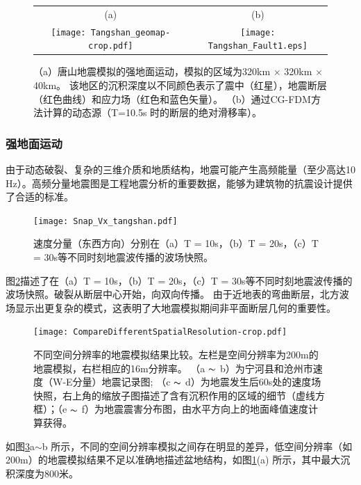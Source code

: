 \begin{figure}[t]
\begin{tabular}{cc}
(a) & (b) \\
    \texttt{[image: Tangshan\_geomap-crop.pdf]} &
    \texttt{[image: Tangshan\_Fault1.eps]}
\end{tabular}
    \caption{
（a）唐山地震模拟的强地面运动，模拟的区域为320km $\times$ 320km $\times$ 40km。 该地区的沉积深度以不同颜色表示了震中（红星），地震断层（红色曲线）和应力场（红色和蓝色矢量）。 （b）通过CG-FDM方法计算的动态源（T=10.5s 时的断层的绝对滑移率）。}
    \label{fig:tangshan_geomap}
\end{figure}


\subsubsection{强地面运动}

由于动态破裂、复杂的三维介质和地质结构，地震可能产生高频能量（至少高达10 Hz）。高频分量地震图是工程地震分析的重要数据，能够为建筑物的抗震设计提供了合适的标准。

\begin{figure}[ht]
    \texttt{[image: Snap\_Vx\_tangshan.pdf]}\\
    \caption{速度分量（东西方向）分别在（a）T = 10s，（b）T = 20s，（c）T = 30s等不同时刻地震波传播的波场快照。}
    \label{fig:strong_motion_2}
\end{figure}

图\ref{fig:strong_motion_2}描述了在（a）T = 10s，（b）T = 20s，（c）T = 30s等不同时刻地震波传播的波场快照。破裂从断层中心开始，向双向传播。 由于近地表的弯曲断层，北方波场显示出更复杂的模式，这表明了大地震模拟期间非平面断层几何的重要性。

\begin{figure}[t]
  \centering
  \texttt{[image: CompareDifferentSpatialResolution-crop.pdf]}
  \caption{
不同空间分辨率的地震模拟结果比较。左栏是空间分辨率为200m的地震模拟，右栏相应的16m分辨率。 （a $ \thicksim $ b）为宁河县和沧州市速度（W-E分量）地震记录图; （c $ \thicksim $ d）为地震发生后60s处的速度场快照，右上角的缩放子图描述了含有沉积作用的区域的细节（虚线方框）；（e $ \thicksim $ f）为地震震害分布图，由水平方向上的地面峰值速度计算获得。}
  \label{fig:strong_motion}
\end{figure}

如图\ref{fig:strong_motion}a$\sim$b 所示，不同的空间分辨率模拟之间存在明显的差异，低空间分辨率（如200m）的地震模拟结果不足以准确地描述盆地结构，如图\ref{fig:tangshan_geomap}(a) 所示，其中最大沉积深度为800米。

